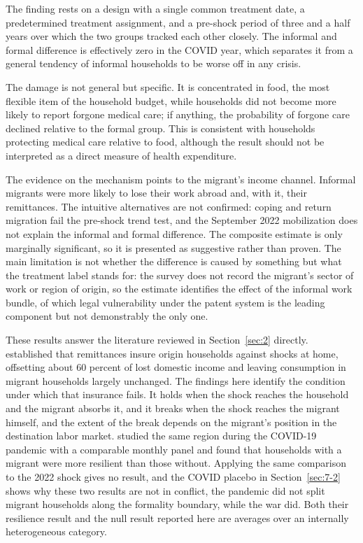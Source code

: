The finding rests on a design with a single common treatment date, a predetermined treatment assignment, and a pre-shock period of three and a half years over which the two groups tracked each other closely. The informal and formal difference is effectively zero in the COVID year, which separates it from a general tendency of informal households to be worse off in any crisis.

The damage is not general but specific. It is concentrated in food, the most flexible item of the household budget, while households did not become more likely to report forgone medical care; if anything, the probability of forgone care declined relative to the formal group. This is consistent with households protecting medical care relative to food, although the result should not be interpreted as a direct measure of health expenditure.

The evidence on the mechanism points to the migrant's income channel. Informal migrants were more likely to lose their work abroad and, with it, their remittances. The intuitive alternatives are not confirmed: coping and return migration fail the pre-shock trend test, and the September 2022 mobilization does not explain the informal and formal difference. The composite estimate is only marginally significant, so it is presented as suggestive rather than proven. The main limitation is not whether the difference is caused by something but what the treatment label stands for: the survey does not record the migrant's sector of work or region of origin, so the estimate identifies the effect of the informal work bundle, of which legal vulnerability under the patent system is the leading component but not demonstrably the only one.

These results answer the literature reviewed in Section~\ref{sec:2} directly. \cite{yang2007} established that remittances insure origin households against shocks at home, offsetting about 60 percent of lost domestic income and leaving consumption in migrant households largely unchanged. The findings here identify the condition under which that insurance fails. It holds when the shock reaches the household and the migrant absorbs it, and it breaks when the shock reaches the migrant himself, and the extent of the break depends on the migrant's position in the destination labor market. \cite{shimizutani2021} studied the same region during the COVID-19 pandemic with a comparable monthly panel and found that households with a migrant were more resilient than those without. Applying the same comparison to the 2022 shock gives no result, and the COVID placebo in Section~\ref{sec:7-2} shows why these two results are not in conflict, the pandemic did not split migrant households along the formality boundary, while the war did. Both their resilience result and the null result reported here are averages over an internally heterogeneous category.

